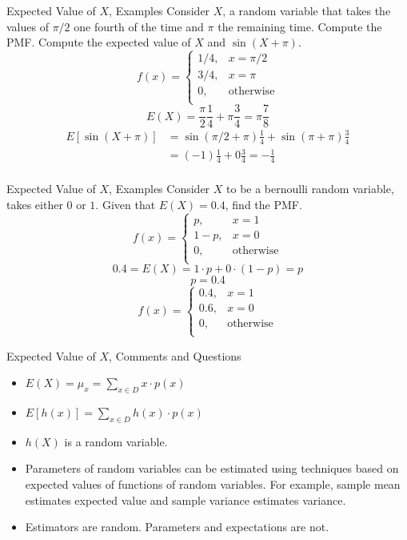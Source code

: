 \documentclass[handout]{beamer}
\begin{document}
\begin{frame}{Expected Value of $X$, Examples}
    Consider $X$, a random variable that takes the values of $\pi/2$ one fourth of the time and $\pi$ the remaining time. Compute the PMF. Compute the expected value of $X$ and $\sin(X+ \pi)$.
    \pause
    $$f(x)= \left\{\begin{array}{lr}
        1/4, & x = \pi/2\\
        3/4, & x= \pi\\
        0, & \text{otherwise}\\
        \end{array}\right.$$
        \pause
        $$ E(X) = \frac{\pi}{2} \frac{1}{4} + \pi \frac{3}{4} = \pi \frac{7}{8} $$
        \pause
        \begin{align*}
            E[\sin(X+\pi)] & = \sin( \pi/2+ \pi) \frac{1}{4} + \sin( \pi+ \pi)\frac{3}{4}\\ 
            & = (-1)\frac{1}{4} + 0\frac{3}{4} = -\frac{1}{4}\\
        \end{align*}
\end{frame}

\begin{frame}{Expected Value of $X$, Examples}
    Consider $X$ to be a bernoulli random variable, takes either $0$ or $1$. Given that $E(X) = 0.4$, find the PMF.
    \pause
    $$f(x)= \left\{\begin{array}{lr}
        p, & x = 1\\
        1-p, & x= 0\\
        0, & \text{otherwise}\\
        \end{array}\right.$$
        \pause
    $$ 0.4 = E(X) = 1\cdot p + 0 \cdot (1-p) = p $$
    $$ p = 0.4$$
    $$f(x)= \left\{\begin{array}{lr}
        0.4, & x = 1\\
        0.6, & x= 0\\
        0, & \text{otherwise}\\
        \end{array}\right.$$
\end{frame}

\begin{frame}{Expected Value of $X$, Comments and Questions}
    \begin{itemize}
        \item $E(X) = \mu_x = \sum_{x \in D} x \cdot p(x) $
        \item $E[h(x)] = \sum_{x \in D} h(x) \cdot p(x) $
        \item $h(X)$ is a random variable.
        \item Parameters of random variables can be estimated using techniques based on expected values of functions of random variables. For example, sample mean estimates expected value and sample variance estimates variance.
        \item Estimators are random. Parameters and expectations are not.
    \end{itemize}
\end{frame}
\end{document}
